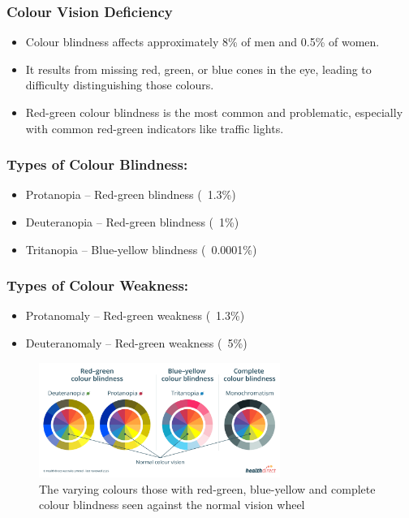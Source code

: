 \documentclass{article}
\begin{document}
\subsubsection{Colour Vision Deficiency}
\begin{itemize}
  \item Colour blindness affects approximately 8\% of men and 0.5\% of women.
  \item It results from missing red, green, or blue cones in the eye, leading to difficulty distinguishing those colours.
  \item Red-green colour blindness is the most common and problematic, especially with common red-green indicators like traffic lights.
\end{itemize}

\subsubsection*{Types of Colour Blindness:}
\begin{itemize}
  \item Protanopia – Red-green blindness (~1.3\%)
  \item Deuteranopia – Red-green blindness (~1\%)
  \item Tritanopia – Blue-yellow blindness (~0.0001\%)
\end{itemize}

\subsubsection*{Types of Colour Weakness:}
\begin{itemize}
  \item Protanomaly – Red-green weakness (~1.3\%)
  \item Deuteranomaly – Red-green weakness (~5\%)
\end{itemize}

\begin{figure}[h]
    \centering
    \includegraphics[width=0.7\textwidth]{types-cb.png}
    \caption{The varying colours those with red-green, blue-yellow and complete colour blindness seen against the normal vision wheel}
    \label{fig:your-label}
\end{figure}
\end{document}
